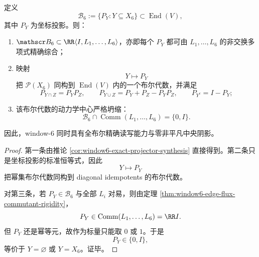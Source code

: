 \begin{theorem}[投影阴影布尔代数的精确综合与中心坍缩]\label{thm:conclusion-window6-boolean-shadow-center-collapse}
定义
\[
\mathscr B_6:=\{P_Y:Y\subseteq X_6\}\subset \operatorname{End}(V),
\]
其中 \(P_Y\) 为坐标投影。则：
\begin{enumerate}
  \item \(\mathscr B_6\subset \RR\langle I,L_1,\dots,L_6\rangle\)，亦即每个 \(P_Y\) 都可由 \(L_1,\dots,L_6\) 的非交换多项式精确综合；
  \item 映射
  \[
  Y\longmapsto P_Y
  \]
  把 \(\mathcal P(X_6)\) 同构到 \(\operatorname{End}(V)\) 内的一个布尔代数，并满足
  \[
  P_{Y\cap Z}=P_YP_Z,
  \qquad
  P_{Y\cup Z}=P_Y+P_Z-P_YP_Z,
  \qquad
  P_{Y^c}=I-P_Y;
  \]
  \item 该布尔代数的动力学中心严格坍缩：
  \[
  \mathscr B_6\cap \operatorname{Comm}(L_1,\dots,L_6)=\{0,I\}.
  \]
\end{enumerate}
因此，window-\(6\) 同时具有全布尔精确读写能力与零非平凡中央阴影。
\end{theorem}
\begin{proof}
第一条由推论 \ref{cor:window6-exact-projector-synthesis} 直接得到。第二条只是坐标投影的标准恒等式，因此
\[
Y\mapsto P_Y
\]
把幂集布尔代数同构到 diagonal idempotents 的布尔代数。

对第三条，若 \(P_Y\in \mathscr B_6\) 与全部 \(L_i\) 对易，则由定理 \ref{thm:window6-edge-flux-commutant-rigidity}，
\[
P_Y\in \operatorname{Comm}(L_1,\dots,L_6)=\RR I.
\]
但 \(P_Y\) 还是幂等元，故作为标量只能取 \(0\) 或 \(1\)。于是
\[
P_Y\in\{0,I\},
\]
等价于 \(Y=\varnothing\) 或 \(Y=X_6\)。证毕。
\end{proof}

